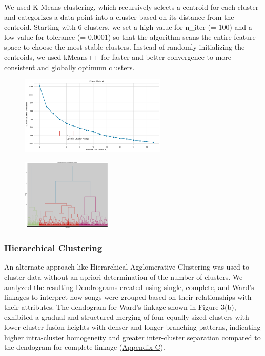 \documentclass{article}
\begin{document}
We used K-Means clustering, which recursively selects a centroid for each cluster and categorizes a data point into a cluster based on its distance from the centroid. Starting with 6 clusters, we set a high value for n\_iter (= 100) and a low value for tolerance (= 0.0001) so that the algorithm scans the entire feature space to choose the most stable clusters. Instead of randomly initializing the centroids, we used kMeans++ for faster and better convergence to more consistent and globally optimum clusters. 

\begin{figure}[H]
\centering
\begin{minipage}{.6\textwidth}
  \centering
  \includegraphics[width=70mm]{Images/CLUSTER K EBLOW.png}
  \label{fig:test3}
\end{minipage}%
\begin{minipage}{.4\textwidth}
  \centering
  \includegraphics[width=43mm]{Images/WARD.PNG}
  \label{fig:test4}
\end{minipage}
\end{figure}


\subsubsection{Hierarchical Clustering}

An alternate approach like Hierarchical Agglomerative Clustering was used to cluster data without an apriori determination of the number of clusters. We analyzed the resulting Dendrograms created using single, complete, and Ward's linkages to interpret how songs were grouped based on their relationships with their attributes. The dendogram for Ward's linkage shown in Figure 3(b), exhibited a gradual and structured merging of four equally sized clusters with lower cluster fusion heights with denser and longer branching patterns, indicating higher intra-cluster homogeneity and greater inter-cluster separation compared to the dendogram for complete linkage (\hyperref[app:completeLink]{Appendix C}).
\end{document}
